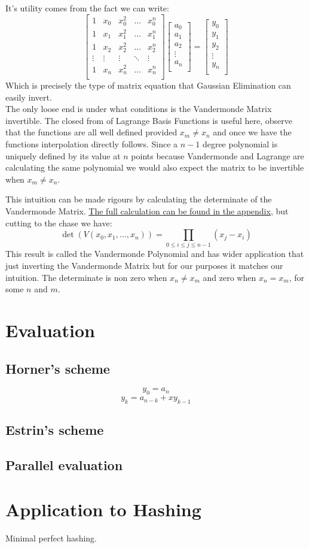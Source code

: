 It's utility comes from the fact we can write:
\[
\begin{bmatrix} 
	1&x_0&x_0^2&\dots&x_0^n \\
	1&x_1&x_1^2&\dots&x_1^n \\
	1&x_2&x_2^2&\dots&x_2^n \\
	\vdots&\vdots&\vdots&\ddots&\vdots \\
	1&x_n&x_n^2&\dots&x_n^n \\
\end{bmatrix}
\begin{bmatrix}
	a_0\\a_1\\a_2\\\vdots\\a_n\\
\end{bmatrix}
=
\begin{bmatrix}
	y_0\\y_1\\y_2\\\vdots\\y_n\\
\end{bmatrix}
\]
Which is precisely the type of matrix equation that Gaussian Elimination can easily invert.
\\

The only loose end is under what conditions is the Vandermonde Matrix invertible.
The closed from of Lagrange Basis Functions is useful here,
observe that the functions are all well defined provided $x_m \neq x_n$ and once we have the functions interpolation directly follows.
Since a $n-1$ degree polynomial is uniquely defined by its value at $n$ points because Vandermonde and Lagrange are calculating the same polynomial we would also expect the matrix to be invertible when $x_m \neq x_n$.

This intuition can be made rigours by calculating the determinate of the Vandermonde Matrix.
\hyperref[appx:vandermonde-polynomial]{The full calculation can be found in the appendix,}
but cutting to the chase we have:
\[\det(V(x_0,x_1,\dots,x_n)) = \prod_{0\leq i \leq j \leq n-1}(x_j-x_i)\]
This result is called the Vandermonde Polynomial and has wider application that just inverting the Vandermonde Matrix but for our purposes it matches our intuition.
The determinate is non zero when $x_n\neq x_m$ and zero when $x_n=x_m$, for some $n$ and $m$.
\section{Evaluation}
\subsection{Horner's scheme}
\[y_0 = a_n\]
\[y_k = a_{n-k}+xy_{k-1}\]
\subsection{Estrin's scheme}
\subsection{Parallel evaluation}
\section{Application to Hashing}
Minimal perfect hashing.
